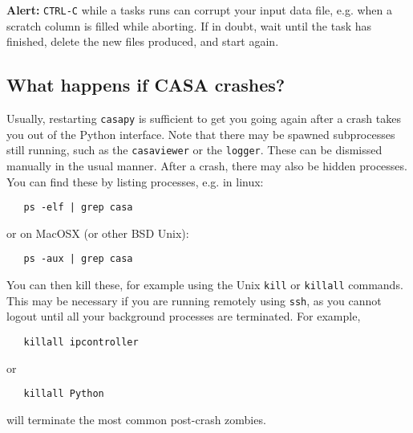 {\bf Alert:} {\tt CTRL-C} while a tasks runs can corrupt your input
data file, e.g. when a scratch column is filled while aborting. If in
doubt, wait until the task has finished, delete the new files produced,
and start again. 



% 
% 
% 

\subsection{What happens if CASA crashes?}
\label{section:intro.basics.crash}

Usually, restarting {\tt casapy} is sufficient to get you going again
after a crash takes you out of the Python interface.  Note that there
may be spawned subprocesses still running, such as the 
{\tt casaviewer} or the {\tt logger}.  These can be dismissed manually
in the usual manner.  After a crash, there may also be hidden
processes.  You can find these by listing processes, e.g. in linux:
\small
\begin{verbatim}
   ps -elf | grep casa
\end{verbatim}
\normalsize
or on MacOSX (or other BSD Unix):
\small
\begin{verbatim}
   ps -aux | grep casa
\end{verbatim}
\normalsize
You can then kill these, for example using the Unix {\tt kill}
or {\tt killall} commands.  This may be necessary if you are running
remotely using {\tt ssh}, as you cannot logout until all your
background processes are terminated.  For example,
\small
\begin{verbatim}
   killall ipcontroller
\end{verbatim}
\normalsize
or
\small
\begin{verbatim}
   killall Python
\end{verbatim}
\normalsize
will terminate the most common post-crash zombies.


